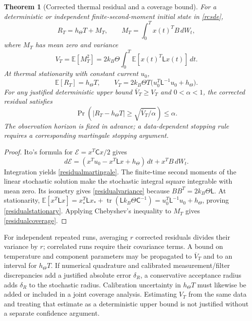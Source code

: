 \documentclass[11pt,letterpaper]{article}
\newcommand{\tr}{\operatorname{tr}}
\newtheorem{theorem}{Theorem}[section]
\theoremstyle{definition}
\numberwithin{equation}{section}
\begin{document}
\begin{theorem}[Corrected thermal residual and a coverage bound]\label{residualtheorem}
For a deterministic or independent finite-second-moment initial state in \eqref{rcsde},
\begin{equation}\label{residualmartingale}
R_T=h_\Theta T+M_T,\qquad
M_T=\int_0^T x(t)^TB\,dW_t,
\end{equation}
where $M_T$ has mean zero and variance
\begin{equation}\label{residualvariance}
V_T=\mathbb E[M_T^2]=2k_B\Theta\int_0^T\mathbb E[x(t)^T\mathsf Lx(t)]\,dt.
\end{equation}
At thermal stationarity with constant current $u_0$,
\begin{equation}\label{residualstationary}
\mathbb E[R_T]=h_\Theta T,\qquad
V_T=2k_B\Theta T\big(u_0^T\mathsf L^{-1}u_0+h_\Theta\big).
\end{equation}
For any justified deterministic upper bound $\overline V_T\geq V_T$ and $0<\alpha<1$, the corrected residual satisfies
\begin{equation}\label{residualcoverage}
\Pr\!\left(|R_T-h_\Theta T|\geq\sqrt{\overline V_T/\alpha}\right)\leq\alpha.
\end{equation}
The observation horizon is fixed in advance; a data-dependent stopping rule requires a corresponding martingale stopping argument.
\end{theorem}
\begin{proof}
Ito's formula for $\mathcal E=x^T\mathsf Cx/2$ gives
\begin{equation}
d\mathcal E=(x^Tu_0-x^T\mathsf Lx+h_\Theta)\,dt+x^TB\,dW_t.
\end{equation}
Integration yields \eqref{residualmartingale}. The finite-time second moments of the linear stochastic solution make the stochastic integral square integrable with mean zero. Its isometry gives \eqref{residualvariance} because $BB^T=2k_B\Theta\mathsf L$. At stationarity, $\mathbb E[x^T\mathsf Lx]=x_*^T\mathsf Lx_*+\tr(\mathsf L k_B\Theta\mathsf C^{-1})=u_0^T\mathsf L^{-1}u_0+h_\Theta$, proving \eqref{residualstationary}. Applying Chebyshev's inequality to $M_T$ gives \eqref{residualcoverage}.
\end{proof}
For independent repeated runs, averaging $r$ corrected residuals divides their variance by $r$; correlated runs require their covariance terms. A bound on temperature and component parameters may be propagated to $\overline V_T$ and to an interval for $h_\Theta T$. If numerical quadrature and calibrated measurement/filter discrepancies add a justified absolute error $\delta_R$, a conservative acceptance radius adds $\delta_R$ to the stochastic radius. Calibration uncertainty in $h_\Theta T$ must likewise be added or included in a joint coverage analysis. Estimating $V_T$ from the same data and treating that estimate as a deterministic upper bound is not justified without a separate confidence argument.
\end{document}
